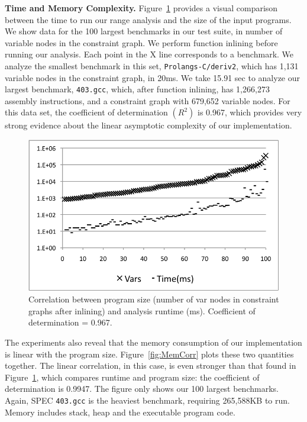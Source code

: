 \documentclass[preprint]{sigplanconf}[10pt]
\begin{document}
\noindent
\textbf{Time and Memory Complexity.}
Figure~\ref{fig:TimeCorr} provides a visual comparison between the time to
run our range analysis and the size of the input programs.
We show data for the 100 largest benchmarks in our test suite, in number
of variable nodes in the constraint graph.
We perform function inlining before running our analysis.
Each point in the X line corresponds to a benchmark.
We analyze the smallest benchmark in this set, \texttt{Prolangs-C/deriv2}, which
has 1,131 variable nodes in the constraint graph, in 20ms.
We take 15.91 sec to analyze our largest benchmark, \texttt{403.gcc}, which,
after function inlining, has 1,266,273 assembly instructions, and a
constraint graph with 679,652 variable nodes.
For this data set, the coefficient of determination $(R^2)$ is 0.967, which
provides very strong evidence about the linear asymptotic complexity of our
implementation.

\begin{figure}[t!]
\begin{center}
\includegraphics[width=\columnwidth]{images/TimeCorr}
\end{center}
\caption{\label{fig:TimeCorr}
Correlation between program size (number of var nodes in constraint
graphs after inlining) and analysis runtime (ms).
Coefficient of determination = 0.967.
}
\end{figure}

The experiments also reveal that the memory consumption of our implementation
is linear with the program size.
Figure~\ref{fig:MemCorr} plots these two quantities together.
The linear correlation, in this case, is even stronger than that found in
Figure~\ref{fig:TimeCorr}, which compares runtime and program size: the
coefficient of determination is 0.9947.
The figure only shows our 100 largest benchmarks.
Again, SPEC \texttt{403.gcc} is the heaviest benchmark, requiring
265,588KB to run.
Memory includes stack, heap and the executable program code.
\end{document}

